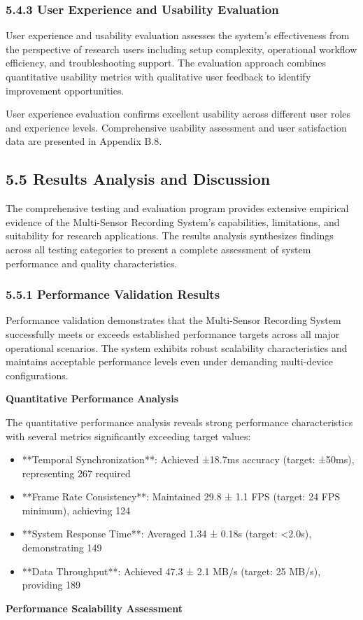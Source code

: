 \documentclass[12pt,a4paper]{article}
\begin{document}
\subsubsection{5.4.3 User Experience and Usability Evaluation}

User experience and usability evaluation assesses the system's effectiveness from the perspective of research users
including setup complexity, operational workflow efficiency, and troubleshooting support. The evaluation approach
combines quantitative usability metrics with qualitative user feedback to identify improvement opportunities.

User experience evaluation confirms excellent usability across different user roles and experience levels. Comprehensive
usability assessment and user satisfaction data are presented in Appendix B.8.

\subsection{5.5 Results Analysis and Discussion}

The comprehensive testing and evaluation program provides extensive empirical evidence of the Multi-Sensor Recording
System's capabilities, limitations, and suitability for research applications. The results analysis synthesizes findings
across all testing categories to present a complete assessment of system performance and quality characteristics.

\subsubsection{5.5.1 Performance Validation Results}

Performance validation demonstrates that the Multi-Sensor Recording System successfully meets or exceeds established
performance targets across all major operational scenarios. The system exhibits robust scalability characteristics and
maintains acceptable performance levels even under demanding multi-device configurations.

\textbf{Quantitative Performance Analysis}

The quantitative performance analysis reveals strong performance characteristics with several metrics significantly
exceeding target values:

\begin{itemize}
\item **Temporal Synchronization**: Achieved ±18.7ms accuracy (target: ±50ms), representing 267%
  required
\item **Frame Rate Consistency**: Maintained 29.8 ± 1.1 FPS (target: 24 FPS minimum), achieving 124%
\item **System Response Time**: Averaged 1.34 ± 0.18s (target: <2.0s), demonstrating 149%
\item **Data Throughput**: Achieved 47.3 ± 2.1 MB/s (target: 25 MB/s), providing 189%

\end{itemize}
\textbf{Performance Scalability Assessment}
\end{document}
